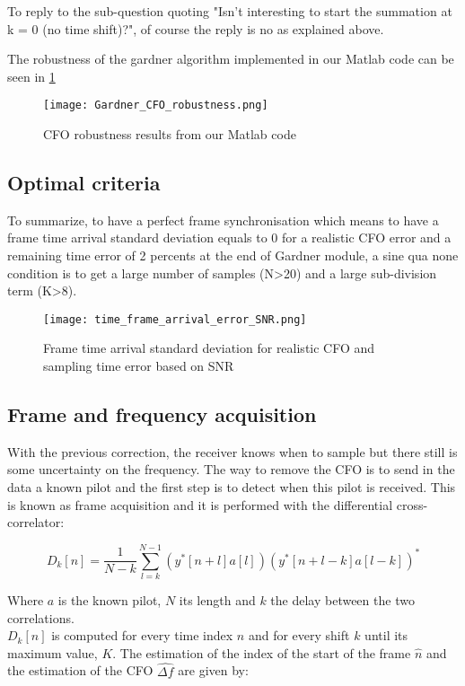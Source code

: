 To reply to the sub-question quoting "Isn’t interesting to start the summation at k = 0 (no time shift)?", of course the reply is no as explained above.

The robustness of the gardner algorithm implemented in our Matlab code can be seen in \ref{fig:Gardner_CFO_robustness}

\begin{figure}[H]
    \centering
    \texttt{[image: Gardner\_CFO\_robustness.png]}
    \caption{CFO robustness results from our Matlab code}
    \label{fig:Gardner_CFO_robustness}
\end{figure}

\subsection{Optimal criteria}

To summarize, to have a perfect frame synchronisation which means to have a frame time arrival standard deviation equals to 0 for a realistic CFO
error and a remaining time error of 2 percents at the end of Gardner module, a sine qua none condition is to get a large number of 
samples (N>20) and a large sub-division term (K>8).

\begin{figure}[H]
    \centering
    \texttt{[image: time\_frame\_arrival\_error\_SNR.png]}
    \caption{Frame time arrival standard deviation for realistic CFO and sampling time error based on SNR}
    \label{fig:time_frame_arrival_error_SNR}
\end{figure}
\subsection{Frame and frequency acquisition}

With the previous correction, the receiver knows when to sample but there still is some uncertainty on the frequency. The way to remove the CFO is to send in the data a known pilot and the first step is to detect when this pilot is received. This is known as frame acquisition and it is performed with the differential cross-correlator:

\begin{equation*}
    D_k[n] = \frac{1}{N-k} \sum_{l=k}^{N-1} \left(y^*[n+l]a[l]\right) \left(y^*[n+l-k]a[l-k]\right)^*
\end{equation*}

Where $a$ is the known pilot, $N$ its length and $k$ the delay between the two correlations. \\
$D_k[n]$ is computed for every time index $n$ and for every shift $k$ until its maximum value, $K$. The estimation of the index of the start of the frame $\hat{n}$ and the estimation of the CFO $\hat{\Delta f}$ are given by:

